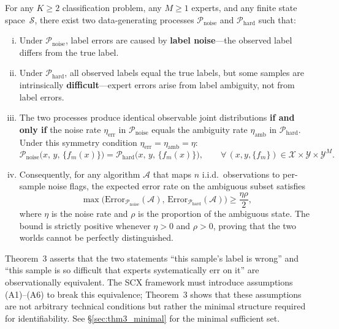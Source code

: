 \begin{theorem}
  \label{thm:unidentifiability}
  For any $K \ge 2$ classification problem, any $M \ge 1$ experts, and any finite
  state space~$\mathcal{S}$, there exist two data-generating processes
  $\mathcal{P}_{\text{noise}}$ and $\mathcal{P}_{\text{hard}}$ such that:
  \begin{enumerate}[(i)]
    \item Under $\mathcal{P}_{\text{noise}}$, label errors are caused by
      \textbf{label noise}---the observed label differs from the true label.
    \item Under $\mathcal{P}_{\text{hard}}$, all observed labels equal the true
      labels, but some samples are intrinsically
      \textbf{difficult}---expert errors arise from label ambiguity, not from
      label errors.
    \item The two processes produce identical observable joint distributions
      \textbf{if and only if} the noise rate $\eta_{\text{err}}$ in $\mathcal{P}_{\text{noise}}$
      equals the ambiguity rate $\eta_{\text{amb}}$ in $\mathcal{P}_{\text{hard}}$.
      Under this symmetry condition $\eta_{\text{err}} = \eta_{\text{amb}} = \eta$:
      \[
      \mathcal{P}_{\text{noise}}\bigl(x,\,y,\,\{f_m(x)\}\bigr)
      = \mathcal{P}_{\text{hard}}\bigl(x,\,y,\,\{f_m(x)\}\bigr),
      \qquad \forall\,(x,y,\{f_m\}) \in \mathcal{X}\times\mathcal{Y}\times\mathcal{Y}^M.
      \]
    \item Consequently, for any algorithm $\mathcal{A}$ that maps $n$ i.i.d.\
      observations to per-sample noise flags, the expected error rate on the
      ambiguous subset satisfies
      \[
      \max\bigl(\mathrm{Error}_{\mathcal{P}_{\text{noise}}}(\mathcal{A}),\,
             \mathrm{Error}_{\mathcal{P}_{\text{hard}}}(\mathcal{A})\bigr)
      \ge \frac{\eta\rho}{2},
      \]
      where $\eta$ is the noise rate and $\rho$ is the proportion of the
      ambiguous state.  The bound is strictly positive whenever $\eta>0$ and
      $\rho>0$, proving that the two worlds cannot be perfectly distinguished.
  \end{enumerate}
\end{theorem}

\begin{remark}
  Theorem~3 asserts that the two statements ``this sample's label is wrong''
  and ``this sample is so difficult that experts systematically err on it'' are
  observationally equivalent.  The SCX framework must introduce assumptions
  (A1)--(A6) to break this equivalence; Theorem~3 shows that these assumptions
  are not arbitrary technical conditions but rather the minimal structure
  required for identifiability.  See \S\ref{sec:thm3_minimal} for the minimal
  sufficient set.
\end{remark}


